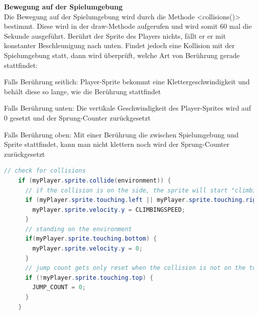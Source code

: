\textbf{Bewegung auf der Spielumgebung}
\\
Die Bewegung auf der Spielumgebung wird durch die Methode <collisions()> bestimmt. Diese wird in der draw-Methode aufgerufen und wird somit 60 mal die Sekunde ausgeführt.
Berührt der Sprite des Players nichts, fällt er er mit konstanter Beschleunigung nach unten.
Findet jedoch eine Kollision mit der Spielumgebung statt, dann wird überprüft, welche Art von Berührung gerade stattfindet:

\begin{compactitem}
    \item Falls Berührung seitlich: Player-Sprite bekommt eine Klettergeschwindigkeit und behält diese so lange, wie die Berührung stattfindet
    \item Falls Berührung unten: Die vertikale Geschwindigkeit des Player-Sprites wird auf 0 gesetzt und der Sprung-Counter zurückgesetzt
    \item Falls Berührung oben: Mit einer Berührung die zwischen Spielumgebung und Sprite stattfindet, kann man nicht klettern noch wird der Sprung-Counter zurückgesetzt
\end{compactitem}

\begin{lstlisting}[caption=Bewegung auf der Spielumgebung,language=Java,label=lst:impl:collisions]
    // check for collisions
    if (myPlayer.sprite.collide(environment)) {
      // if the collision is on the side, the sprite will start "climbing" with a certain speed
      if (myPlayer.sprite.touching.left || myPlayer.sprite.touching.right) {
        myPlayer.sprite.velocity.y = CLIMBINGSPEED;
      }
      // standing on the environment
      if(myPlayer.sprite.touching.bottom) {
        myPlayer.sprite.velocity.y = 0; 
      }
      // jump count gets only reset when the collision is not on the top of the player-sprite
      if (!myPlayer.sprite.touching.top) {
        JUMP_COUNT = 0;
      }
    }
\end{lstlisting}

